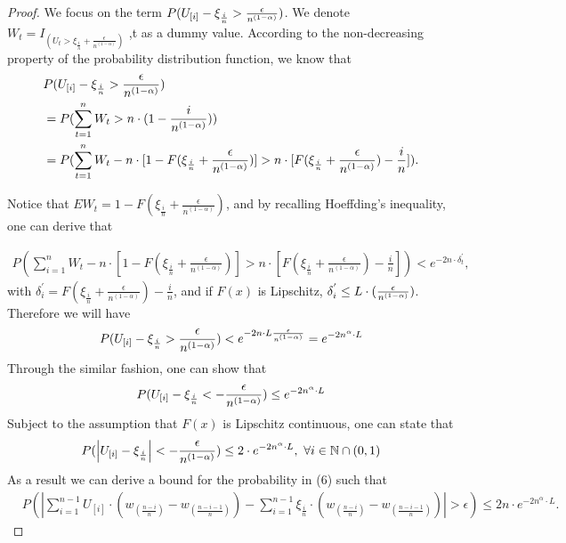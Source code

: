 \begin{proof}
\noindent We focus on the term 
$
P ( U_{[i]} - \xi_{\frac{i}{n}} > \frac {\epsilon}{n^{(1-\alpha)}})
$.
We denote $W_t= I_{(U_t > \xi_{\frac{i}{n}} + \frac{\epsilon}{n^{(1-\alpha)}})}$
,t as a dummy value. According to the non-decreasing property of the probability distribution function, we know that 
\begin{align*}
& P ( U_{[i]} - \xi_{\frac{i}{n}} > \frac {\epsilon}{n^{(1-\alpha)}}) \\ & = P ( \sum _{t=1}^{n} W_t >
n\cdot(1-\frac{i}{n^{(1-\alpha)}})) \\ & = P ( \sum _{t=1}^{n} W_t - n \cdot [1-F(\xi_{\frac{i}{n}}
+\frac{\epsilon}{n^{(1-\alpha)}})] > n \cdot [F(\xi_{\frac{i}{n}} +\frac{\epsilon}{n^{(1-\alpha)}})
- \frac{i}{n}]).
\end{align*}

\noindent Notice that 
$E W_t = 1-F(\xi_{\frac{i}{n}} +\frac{\epsilon}{n^{(1-\alpha)}})$, and by recalling Hoeffding's inequality, one can derive that

\begin{align}
P ( \sum _{i=1}^{n} W_t - n \cdot [1-F(\xi_{\frac{i}{n}} +\frac{\epsilon}{n^{(1-\alpha) }  } ) ] > n
\cdot [F(\xi_{\frac{i}{n}} +\frac{\epsilon}{n^{(1-\alpha)} } ) - \frac{i}{n}]) < e^{-2n\cdot
\delta^{'}_t},
\end{align}
with $\delta^{'}_i = F(\xi_{\frac{i}{n}} +\frac{\epsilon} {n^{(1-\alpha)} }) - \frac{i}{n}$, and if 
$F(x)$ is Lipschitz, $ \delta^{'}_i \leq L \cdot (\frac{\epsilon}{n^{(1-\alpha)}})$.
Therefore we will have
\begin{align}
P ( U_{[i]} - \xi_{\frac{i}{n}} > \frac {\epsilon}{n^{(1-\alpha)}}) < e^{-2n\cdot L
\frac{\epsilon}{n^{(1-\alpha)}} } = e^{-2n^\alpha \cdot L }
\end{align}
Through the similar fashion, one can show that 
\begin{align*}
P ( U_{[i]} -\xi_{\frac{i}{n}} < -\frac {\epsilon} {n^{(1-\alpha)}}) \leq e^{-2n^\alpha \cdot L }
\end{align*}
Subject to the assumption that $F(x)$ is Lipschitz continuous, one can state that 
\begin{align*}
P ( \left| U_{[i]} -\xi_{\frac{i}{n}} \right| < -\frac {\epsilon} {n^{(1-\alpha)}}) \leq 2\cdot
e^{-2n^\alpha \cdot L } , \text{   }\forall i\in \mathbb{N} \cap (0,1) 
\end{align*}
As a result we can derive a bound for the probability in (6) such that
\begin{align}
&
P ( \left| \sum_{i=1}^{n-1} U_{[i]} \cdot (w_{(\frac{n-i}{n})} - w_{(\frac{n-i-1}{n})}) -
\sum_{i=1}^{n-1} \xi_{\frac{i}{n}} \cdot (w_{(\frac{n-i}{n})} - w_{(\frac{n-i-1}{n})}) \right| >
\epsilon) \leq 2n\cdot e^{-2n^\alpha \cdot L}.\label{eq:holder-sample-complexity-extract}
\end{align}


\end{proof}
